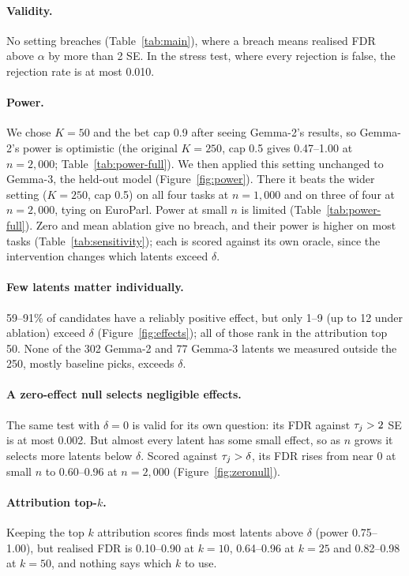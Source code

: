 \paragraph{Validity.} No setting breaches (Table~\ref{tab:main}), where a breach means realised FDR above $\alpha$ by
more than 2 SE. In the stress test, where every rejection
is false, the rejection rate is at most 0.010.

\paragraph{Power.} We chose $K = 50$ and the bet cap 0.9 after seeing Gemma-2's results, so Gemma-2's power is
optimistic (the original $K = 250$, cap 0.5 gives 0.47--1.00 at $n = 2{,}000$; Table~\ref{tab:power-full}).
We then applied this setting unchanged to Gemma-3, the held-out model (Figure~\ref{fig:power}). There it beats the wider setting ($K = 250$, cap 0.5) on all four tasks at
$n = 1{,}000$ and on three of four at $n = 2{,}000$, tying on EuroParl. Power at small $n$ is limited (Table~\ref{tab:power-full}).
Zero and mean ablation give no breach, and their power is higher on most tasks (Table~\ref{tab:sensitivity}); each is scored against its own oracle, since the intervention changes which latents exceed $\delta$.

\paragraph{Few latents matter individually.} 59--91\% of candidates have a reliably positive effect, but
only 1--9 (up to 12 under ablation) exceed $\delta$ (Figure~\ref{fig:effects}); all of those rank in the attribution top 50. None of the 302 Gemma-2 and 77 Gemma-3 latents we measured outside the 250, mostly baseline picks, exceeds $\delta$.

\paragraph{A zero-effect null selects negligible effects.} The same test with $\delta = 0$ is valid for its own question: its FDR against $\tau_j > 2$ SE is at most 0.002. But almost every latent has some small effect, so as $n$ grows it selects more latents below $\delta$. Scored against $\tau_j > \delta$, its FDR rises from near 0 at small $n$ to 0.60--0.96 at $n = 2{,}000$ (Figure~\ref{fig:zeronull}).

\paragraph{Attribution top-$k$.} Keeping the top $k$ attribution scores finds most latents above $\delta$ (power 0.75--1.00),
but realised FDR is 0.10--0.90 at $k = 10$, 0.64--0.96 at $k = 25$ and 0.82--0.98 at $k = 50$, and nothing says which $k$ to use.


